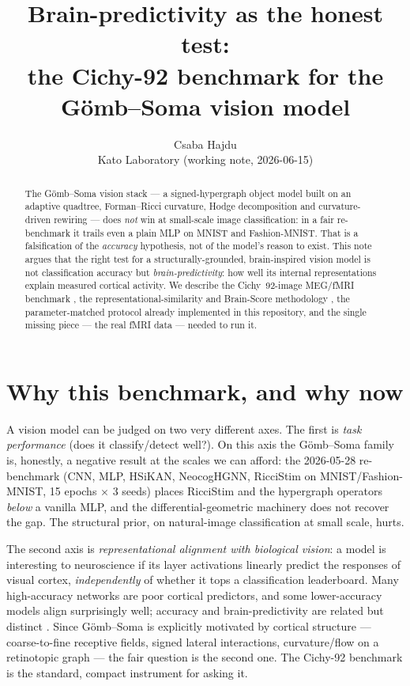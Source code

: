 \documentclass[11pt]{article}
\title{\textbf{Brain-predictivity as the honest test:\\
the Cichy-92 benchmark for the G\"omb--Soma vision model}}
\author{Csaba Hajdu \\ \small Kato Laboratory \quad (working note, 2026-06-15)}
\date{}
\begin{document}
\maketitle

\begin{abstract}
\noindent
The G\"omb--Soma vision stack --- a signed-hypergraph object model built on an
adaptive quadtree, Forman--Ricci curvature, Hodge decomposition and
curvature-driven rewiring --- does \emph{not} win at small-scale image
classification: in a fair re-benchmark it trails even a plain MLP on MNIST and
Fashion-MNIST. That is a falsification of the \emph{accuracy} hypothesis, not of
the model's reason to exist. This note argues that the right test for a
structurally-grounded, brain-inspired vision model is not classification accuracy
but \emph{brain-predictivity}: how well its internal representations explain
measured cortical activity. We describe the Cichy~92-image MEG/fMRI benchmark
\cite{cichy2014}, the representational-similarity and Brain-Score methodology
\cite{kriegeskorte2008,schrimpf2018}, the parameter-matched protocol already
implemented in this repository, and the single missing piece --- the real fMRI
data --- needed to run it.
\end{abstract}

\section{Why this benchmark, and why now}
A vision model can be judged on two very different axes. The first is
\emph{task performance} (does it classify/detect well?). On this axis the
G\"omb--Soma family is, honestly, a negative result at the scales we can afford:
the 2026-05-28 re-benchmark (CNN, MLP, HSiKAN, NeocogHGNN, RicciStim on
MNIST/Fashion-MNIST, 15 epochs $\times$ 3 seeds) places RicciStim and the
hypergraph operators \emph{below} a vanilla MLP, and the differential-geometric
machinery does not recover the gap. The structural prior, on natural-image
classification at small scale, hurts.

The second axis is \emph{representational alignment with biological vision}: a
model is interesting to neuroscience if its layer activations linearly predict
the responses of visual cortex, \emph{independently} of whether it tops a
classification leaderboard. Many high-accuracy networks are poor cortical
predictors, and some lower-accuracy models align surprisingly well; accuracy and
brain-predictivity are related but distinct \cite{yamins2014,schrimpf2018}. Since
G\"omb--Soma is explicitly motivated by cortical structure --- coarse-to-fine
receptive fields, signed lateral interactions, curvature/flow on a retinotopic
graph --- the fair question is the second one. The Cichy-92 benchmark is the
standard, compact instrument for asking it.
\end{document}
